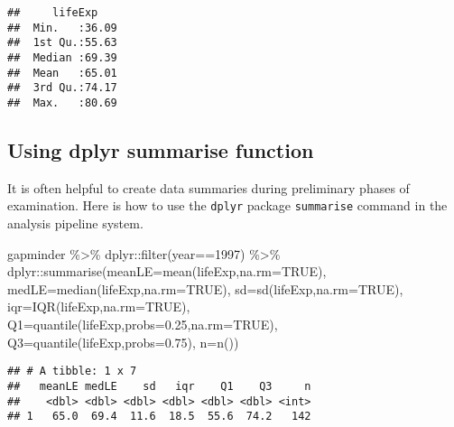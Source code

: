 \documentclass[
]{book}
\newenvironment{Shaded}{\begin{snugshade}}{\end{snugshade}}
\newcommand{\AttributeTok}[1]{\textcolor[rgb]{0.77,0.63,0.00}{#1}}
\newcommand{\ConstantTok}[1]{\textcolor[rgb]{0.00,0.00,0.00}{#1}}
\newcommand{\DecValTok}[1]{\textcolor[rgb]{0.00,0.00,0.81}{#1}}
\newcommand{\FloatTok}[1]{\textcolor[rgb]{0.00,0.00,0.81}{#1}}
\newcommand{\FunctionTok}[1]{\textcolor[rgb]{0.00,0.00,0.00}{#1}}
\newcommand{\NormalTok}[1]{#1}
\newcommand{\SpecialCharTok}[1]{\textcolor[rgb]{0.00,0.00,0.00}{#1}}
\begin{document}
\begin{verbatim}
##     lifeExp     
##  Min.   :36.09  
##  1st Qu.:55.63  
##  Median :69.39  
##  Mean   :65.01  
##  3rd Qu.:74.17  
##  Max.   :80.69
\end{verbatim}

\hypertarget{using-dplyr-summarise-function}{%
\subsection{Using dplyr summarise function}\label{using-dplyr-summarise-function}}

It is often helpful to create data summaries during preliminary phases of examination. Here is how to use the \texttt{dplyr} package \texttt{summarise} command in the analysis pipeline system.

\begin{Shaded}
\begin{Highlighting}[]
\NormalTok{gapminder }\SpecialCharTok{\%\textgreater{}\%} 
\NormalTok{  dplyr}\SpecialCharTok{::}\FunctionTok{filter}\NormalTok{(year}\SpecialCharTok{==}\DecValTok{1997}\NormalTok{) }\SpecialCharTok{\%\textgreater{}\%} 
\NormalTok{      dplyr}\SpecialCharTok{::}\FunctionTok{summarise}\NormalTok{(}\AttributeTok{meanLE=}\FunctionTok{mean}\NormalTok{(lifeExp,}\AttributeTok{na.rm=}\ConstantTok{TRUE}\NormalTok{),}
                       \AttributeTok{medLE=}\FunctionTok{median}\NormalTok{(lifeExp,}\AttributeTok{na.rm=}\ConstantTok{TRUE}\NormalTok{),}
                       \AttributeTok{sd=}\FunctionTok{sd}\NormalTok{(lifeExp,}\AttributeTok{na.rm=}\ConstantTok{TRUE}\NormalTok{),}
                       \AttributeTok{iqr=}\FunctionTok{IQR}\NormalTok{(lifeExp,}\AttributeTok{na.rm=}\ConstantTok{TRUE}\NormalTok{),}
                      \AttributeTok{Q1=}\FunctionTok{quantile}\NormalTok{(lifeExp,}\AttributeTok{probs=}\FloatTok{0.25}\NormalTok{,}\AttributeTok{na.rm=}\ConstantTok{TRUE}\NormalTok{),}
                      \AttributeTok{Q3=}\FunctionTok{quantile}\NormalTok{(lifeExp,}\AttributeTok{probs=}\FloatTok{0.75}\NormalTok{),}
                      \AttributeTok{n=}\FunctionTok{n}\NormalTok{())}
\end{Highlighting}
\end{Shaded}

\begin{verbatim}
## # A tibble: 1 x 7
##   meanLE medLE    sd   iqr    Q1    Q3     n
##    <dbl> <dbl> <dbl> <dbl> <dbl> <dbl> <int>
## 1   65.0  69.4  11.6  18.5  55.6  74.2   142
\end{verbatim}
\end{document}
